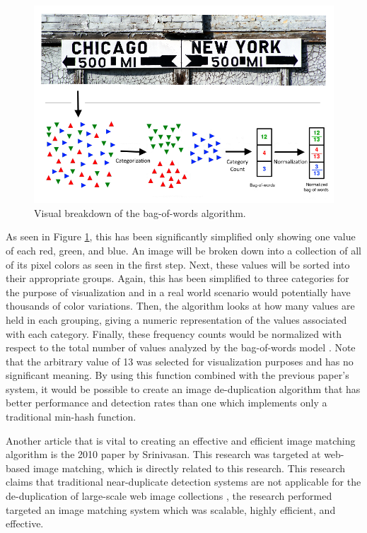 \begin{figure}[htbp]
\centering
\includegraphics[width=5in]{bagofwords}
\caption{Visual breakdown of the bag-of-words algorithm.}
\label{bagofwords}
\end{figure}

As seen in Figure \ref{bagofwords}, this has been significantly simplified only showing one value of each red, green, and blue. An image will be broken down into a collection of all of its pixel colors as seen in the first step. Next, these values will be sorted into their appropriate groups. Again, this has been simplified to three categories for the purpose of visualization and in a real world scenario would potentially have thousands of color variations. Then, the algorithm looks at how many values are held in each grouping, giving a numeric representation of the values associated with each category. Finally, these frequency counts would be normalized with respect to the total number of values analyzed by the bag-of-words model \cite{ZhangYinZhou}. Note that the arbitrary value of 13 was selected for visualization purposes and has no significant meaning. By using this function combined with the previous paper's system, it would be possible to create an image de-duplication algorithm that has better performance and detection rates than one which implements only a traditional min-hash function.

Another article that is vital to creating an effective and efficient image matching algorithm is the 2010 paper by Srinivasan. This research was targeted at web-based image matching, which is directly related to this research. This research claims that traditional near-duplicate detection systems are not applicable for the de-duplication of large-scale web image collections \cite{Srinivasan:2008}, the research performed targeted an image matching system which was scalable, highly efficient, and effective.

